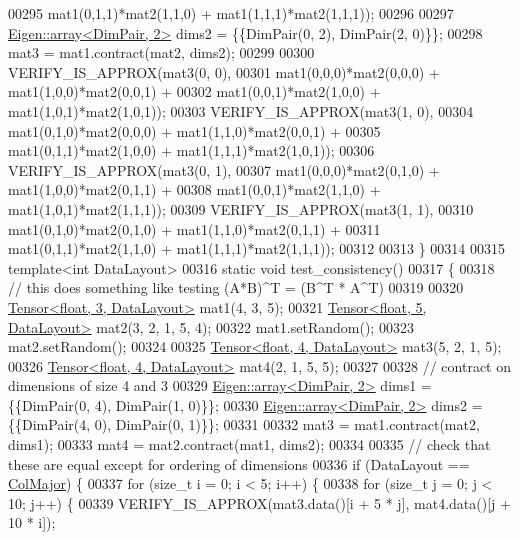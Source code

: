 \begin{DoxyCode}
00295                    mat1(0,1,1)*mat2(1,1,0) + mat1(1,1,1)*mat2(1,1,1));
00296 
00297   \hyperlink{class_eigen_1_1array}{Eigen::array<DimPair, 2>} dims2 = \{\{DimPair(0, 2), DimPair(2, 0)\}\};
00298   mat3 = mat1.contract(mat2, dims2);
00299 
00300   VERIFY\_IS\_APPROX(mat3(0, 0),
00301                    mat1(0,0,0)*mat2(0,0,0) + mat1(1,0,0)*mat2(0,0,1) +
00302                    mat1(0,0,1)*mat2(1,0,0) + mat1(1,0,1)*mat2(1,0,1));
00303   VERIFY\_IS\_APPROX(mat3(1, 0),
00304                    mat1(0,1,0)*mat2(0,0,0) + mat1(1,1,0)*mat2(0,0,1) +
00305                    mat1(0,1,1)*mat2(1,0,0) + mat1(1,1,1)*mat2(1,0,1));
00306   VERIFY\_IS\_APPROX(mat3(0, 1),
00307                    mat1(0,0,0)*mat2(0,1,0) + mat1(1,0,0)*mat2(0,1,1) +
00308                    mat1(0,0,1)*mat2(1,1,0) + mat1(1,0,1)*mat2(1,1,1));
00309   VERIFY\_IS\_APPROX(mat3(1, 1),
00310                    mat1(0,1,0)*mat2(0,1,0) + mat1(1,1,0)*mat2(0,1,1) +
00311                    mat1(0,1,1)*mat2(1,1,0) + mat1(1,1,1)*mat2(1,1,1));
00312 
00313 \}
00314 
00315 \textcolor{keyword}{template}<\textcolor{keywordtype}{int} DataLayout>
00316 \textcolor{keyword}{static} \textcolor{keywordtype}{void} test\_consistency()
00317 \{
00318   \textcolor{comment}{// this does something like testing (A*B)^T = (B^T * A^T)}
00319 
00320   \hyperlink{class_eigen_1_1_tensor}{Tensor<float, 3, DataLayout>} mat1(4, 3, 5);
00321   \hyperlink{class_eigen_1_1_tensor}{Tensor<float, 5, DataLayout>} mat2(3, 2, 1, 5, 4);
00322   mat1.setRandom();
00323   mat2.setRandom();
00324 
00325   \hyperlink{class_eigen_1_1_tensor}{Tensor<float, 4, DataLayout>} mat3(5, 2, 1, 5);
00326   \hyperlink{class_eigen_1_1_tensor}{Tensor<float, 4, DataLayout>} mat4(2, 1, 5, 5);
00327 
00328   \textcolor{comment}{// contract on dimensions of size 4 and 3}
00329   \hyperlink{class_eigen_1_1array}{Eigen::array<DimPair, 2>} dims1 = \{\{DimPair(0, 4), DimPair(1, 0)\}\};
00330   \hyperlink{class_eigen_1_1array}{Eigen::array<DimPair, 2>} dims2 = \{\{DimPair(4, 0), DimPair(0, 1)\}\};
00331 
00332   mat3 = mat1.contract(mat2, dims1);
00333   mat4 = mat2.contract(mat1, dims2);
00334 
00335   \textcolor{comment}{// check that these are equal except for ordering of dimensions}
00336   \textcolor{keywordflow}{if} (DataLayout == \hyperlink{group__enums_ggaacded1a18ae58b0f554751f6cdf9eb13a0cbd4bdd0abcfc0224c5fcb5e4f6669a}{ColMajor}) \{
00337     \textcolor{keywordflow}{for} (\textcolor{keywordtype}{size\_t} i = 0; i < 5; i++) \{
00338       \textcolor{keywordflow}{for} (\textcolor{keywordtype}{size\_t} j = 0; j < 10; j++) \{
00339         VERIFY\_IS\_APPROX(mat3.data()[i + 5 * j], mat4.data()[j + 10 * i]);

\end{DoxyCode}
